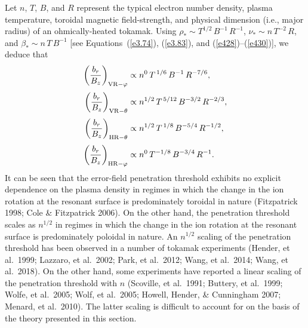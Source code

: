 \documentclass[notitlepage,12pt]{article}
\begin{document}
Let $n$, $T$, $B$, and $R$ represent the typical electron number density, plasma temperature, toroidal magnetic field-strength,
and physical dimension (i.e., major radius) of an ohmically-heated tokamak. Using $\rho_\ast\sim T^{1/2}\,B^{-1}\,R^{-1}$, 
$\nu_\ast\sim n\,T^{-2}\,R$, and $\beta_\ast\sim n\,T\,B^{-1}$ [see Equations~(\ref{e3.74}), (\ref{e3.83}), and (\ref{e428})--(\ref{e430})],
we deduce that
\begin{align}
\left(\frac{b_{r}}{B_z}\right)_{{\rm VR}-\varphi} &\propto n^{0}\,T^{\,1/6}\,B^{-1}\,R^{-7/6},\\[0.5ex]
\left(\frac{b_{r}}{B_z}\right)_{{\rm VR}-\theta} &\propto n^{1/2}\,T^{\,5/12}\,B^{-3/2}\,R^{-2/3},\\[0.5ex]
\left(\frac{b_{r}}{B_z}\right)_{{\rm HR}-\theta} &\propto n^{1/2}\,T^{\,1/8}\,B^{-5/4}\,R^{-1/2},\\[0.5ex]
\left(\frac{b_{r}}{B_z}\right)_{{\rm HR}-\varphi} &\propto n^{0}\,T^{-1/8}\,B^{-3/4}\,R^{-1}.
\end{align}
It can be seen that the error-field penetration threshold exhibits no explicit dependence on the plasma
density in regimes in which the change in the ion rotation at the resonant surface is predominately toroidal
in nature (Fitzpatrick 1998; Cole \& Fitzpatrick 2006). On the other hand, the penetration threshold
scales as $n^{1/2}$ in regimes in which the change in the ion rotation at the resonant surface is predominately poloidal 
in nature. An $n^{1/2}$ scaling of the penetration threshold has been observed in a number of tokamak
experiments (Hender, et al.\ 1999; Lazzaro, et al.\ 2002; Park, et al.\ 2012; Wang, et al.\ 2014; Wang, et al.\ 2018). 
On the other hand, some experiments have reported a linear scaling of the penetration threshold with $n$ (Scoville, et al.\ 1991; Buttery, et al.\ 1999; Wolfe, et al.\ 2005; Wolf, et al.\ 2005; Howell, Hender, \& Cunningham 2007; Menard, et al.\ 2010). The latter
scaling is difficult to account for on the basis of the theory presented in this section. 
\end{document}
